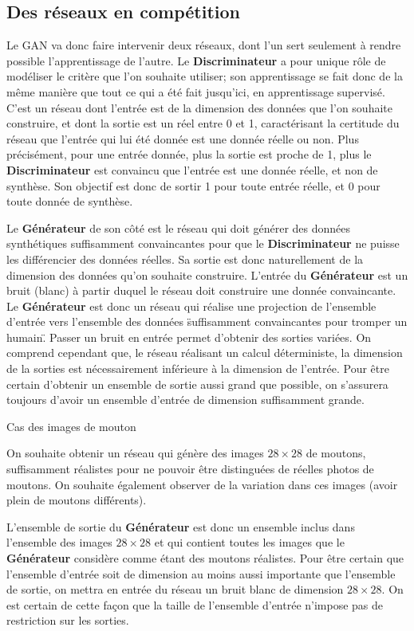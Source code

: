 \subsection{Des réseaux en compétition}

Le GAN va donc faire intervenir deux réseaux, dont l'un sert seulement à rendre possible l'apprentissage de l'autre. Le \textbf{Discriminateur} a pour unique rôle de modéliser le critère que l'on souhaite utiliser; son apprentissage se fait donc de la même manière que tout ce qui a été fait jusqu'ici, en apprentissage supervisé. C'est un réseau dont l'entrée est de la dimension des données que l'on souhaite construire, et dont la sortie est un réel entre 0 et 1, caractérisant la certitude du réseau que l'entrée qui lui été donnée est une donnée réelle ou non. Plus précisément, pour une entrée donnée, plus la sortie est proche de 1, plus le \textbf{Discriminateur} est convaincu que l'entrée est une donnée réelle, et non de synthèse. Son objectif est donc de sortir 1 pour toute entrée réelle, et 0 pour toute donnée de synthèse.

Le \textbf{Générateur} de son côté est le réseau qui doit générer des données synthétiques suffisamment convaincantes pour que le \textbf{Discriminateur} ne puisse les différencier des données réelles. Sa sortie est donc naturellement de la dimension des données qu'on souhaite construire. L'entrée du \textbf{Générateur} est un bruit (blanc) à partir duquel le réseau doit construire une donnée convaincante. Le \textbf{Générateur} est donc un réseau qui réalise une projection de l'ensemble d'entrée vers l'ensemble des données \"suffisamment convaincantes pour tromper un humain\". Passer un bruit en entrée permet d'obtenir des sorties variées. On comprend cependant que, le réseau réalisant un calcul déterministe, la dimension de la sorties est nécessairement inférieure à la dimension de l'entrée. Pour être certain d'obtenir un ensemble de sortie aussi grand que possible, on s'assurera toujours d'avoir un ensemble d'entrée de dimension suffisamment grande. \\

\begin{example} Cas des images de mouton

On souhaite obtenir un réseau qui génère des images $28 \times 28$ de moutons, suffisamment réalistes pour ne pouvoir être distinguées de réelles photos de moutons. On souhaite également observer de la variation dans ces images (avoir plein de moutons différents). 

L'ensemble de sortie du \textbf{Générateur} est donc un ensemble inclus dans l'ensemble des images $28 \times 28$ et qui contient toutes les images que le \textbf{Générateur} considère comme étant des moutons réalistes. Pour être certain que l'ensemble d'entrée soit de dimension au moins aussi importante que l'ensemble de sortie, on mettra en entrée du réseau un bruit blanc de dimension $28 \times 28$. On est certain de cette façon que la taille de l'ensemble d'entrée n'impose pas de restriction sur les sorties. 

\end{example}

